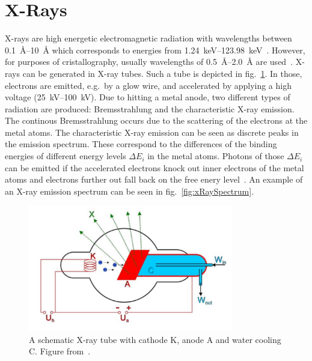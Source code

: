  
\section{X-Rays}\label{sec:Q1}

X-rays are high energetic electromagnetic radiation with wavelengths between \SIrange{0.1}{10}{\angstrom} which corresponds to energies from \SIrange{1.24}{123.98}{\kilo\eV}~\cite{Bohm.2021}. However, for purposes of cristallography, usually wavelengths of \SIrange{0.5}{2.0}{\angstrom} are used~\cite{Schwarzenbach.2001}. X-rays can be generated in X-ray tubes. Such a tube is depicted in fig.~\ref{fig:xrayTube}. In those, electrons are emitted, e.g.~by a glow wire, and accelerated by applying a high voltage (\SIrange{25}{100}{\kilo\V}). Due to hitting a metal anode, two different types of radiation are produced: Bremsstrahlung and the characteristic X-ray emission. The continous Bremsstrahlung occurs due to the scattering of the electrons at the metal atoms. The characteristic X-ray emission can be seen as discrete peaks in the emission spectrum. These correspond to the differences of the binding energies of different energy levels $\Delta E_i$ in the metal atoms. Photons of those $\Delta E_i$ can be emitted if the accelerated electrons knock out inner electrons of the metal atoms and electrons further out fall back on the free enery level~\cite{Bohm.2021}. An example of an X-ray emission spectrum can be seen in fig.~\ref{fig:xRaySpectrum}. \par 

\begin{figure}[ht]
    \centering
    \includegraphics[width = 0.8\textwidth]{Bilder/Grundlagen/xrayTube.png}
    \caption{A schematic X-ray tube with cathode K, anode A and water cooling C. Figure from~\cite{SlideService2014}.}
    \label{fig:xrayTube}
\end{figure}


